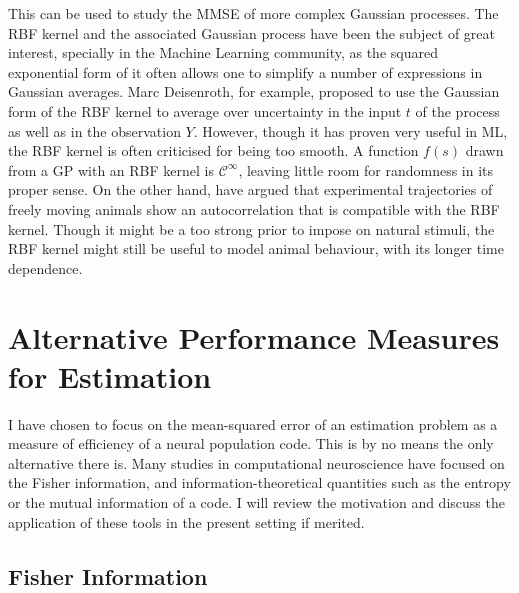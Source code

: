 This can be used to study the MMSE of more complex Gaussian processes. The RBF kernel and the associated Gaussian process have been the subject of great
interest, specially in the Machine Learning community, as the squared exponential form of it often allows one to simplify a number of expressions in Gaussian
averages. Marc Deisenroth, for example, proposed to use the Gaussian form of the RBF kernel to average over uncertainty in the input $t$ of the process 
as
well as in the observation $Y$. However, though it has proven very useful in ML, the RBF kernel is often criticised for being too smooth. 
A function $f(s)$ drawn from a GP with an RBF kernel is $\mathcal{C}^\infty$, leaving little room for randomness in its proper sense. On the other hand,  have argued
that experimental trajectories of freely moving animals show an autocorrelation that is compatible with the RBF kernel. Though it might be a too strong prior to impose on natural 
stimuli, the RBF kernel might still be useful to model animal behaviour, with its longer time dependence.

\section{Alternative Performance Measures for Estimation}

I have chosen to focus on the mean-squared error of an estimation problem as a measure of efficiency of a neural population code. This is by no means the
only alternative there is. Many studies in computational neuroscience have focused on the Fisher information, and information-theoretical 
quantities such as the entropy or the mutual information of a code. I will review the motivation and discuss the application of these tools in 
the present setting if merited.

\subsection{Fisher Information}
\label{sec:fisher_info}

